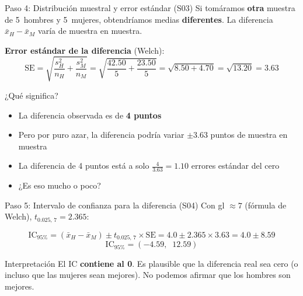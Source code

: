 \documentclass[aspectratio=169, 11pt]{beamer}
\begin{document}
\begin{frame}{Paso 4: Distribución muestral y error estándar (S03)}
\small
Si tomáramos \textbf{otra} muestra de 5~hombres y 5~mujeres, obtendríamos medias \textbf{diferentes}. La diferencia $\bar{x}_H - \bar{x}_M$ varía de muestra en muestra.

\vspace{0.3cm}
\textbf{Error estándar de la diferencia} (Welch):
\[
\text{SE} = \sqrt{\frac{s_H^2}{n_H} + \frac{s_M^2}{n_M}} = \sqrt{\frac{42.50}{5} + \frac{23.50}{5}} = \sqrt{8.50 + 4.70} = \sqrt{13.20} = 3.63
\]

\vspace{0.2cm}
\begin{block}{¿Qué significa?}
\begin{itemize}\setlength{\itemsep}{2pt}
  \item La diferencia observada es de \textbf{4 puntos}
  \item Pero por puro azar, la diferencia podría variar $\pm 3.63$ puntos de muestra en muestra
  \item La diferencia de 4 puntos está a solo $\frac{4}{3.63} = 1.10$ errores estándar del cero
  \item ¿Es eso mucho o poco?
\end{itemize}
\end{block}
\end{frame}

\begin{frame}{Paso 5: Intervalo de confianza para la diferencia (S04)}
\small
Con gl $\approx 7$ (fórmula de Welch), $t_{0.025,\,7} = 2.365$:

\[
\text{IC}_{95\%} = (\bar{x}_H - \bar{x}_M) \pm t_{0.025,\,7} \times \text{SE} = 4.0 \pm 2.365 \times 3.63 = 4.0 \pm 8.59
\]
\[
\boxed{\text{IC}_{95\%} = (-4.59,\;\; 12.59)}
\]

\vspace{0.2cm}
\begin{center}
\end{center}

\begin{alertblock}{Interpretación}
El IC \textbf{contiene al 0}. Es plausible que la diferencia real sea cero (o incluso que las mujeres sean mejores). No podemos afirmar que los hombres son mejores.
\end{alertblock}
\end{frame}
\end{document}
